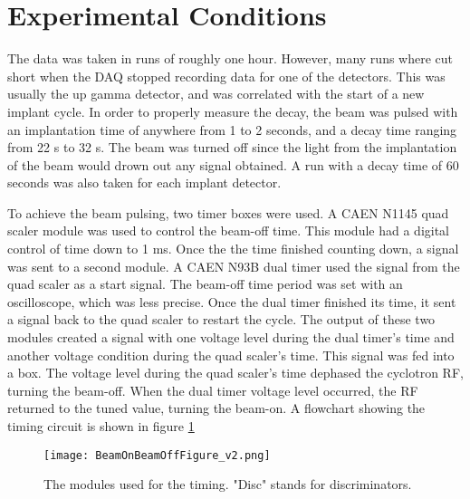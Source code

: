 \documentclass[../MaxHughesThesis.tex]{subfiles}
\begin{document}
\section{Experimental Conditions}
The data was taken in runs of roughly one hour. 
However, many runs where cut short when the DAQ stopped recording data for one of the detectors.
This was usually the up gamma detector, and was correlated with the start of a new implant cycle.
In order to properly measure the decay, the beam was pulsed with an implantation time of anywhere from 1 to 2 seconds, and a decay time ranging from 22 s to 32 s. 
The beam was turned off since the light from the implantation of the beam would drown out any signal obtained. 
A run with a decay time of 60 seconds was also taken for each implant detector. 

To achieve the beam pulsing, two timer boxes were used.
A CAEN N1145 quad scaler module was used to control the beam-off time.
This module had a digital control of time down to 1 ms.
Once the the time finished counting down, a signal was sent to a second module. 
A CAEN N93B dual timer used the signal from the quad scaler as a start signal.
The beam-off time period was set with an oscilloscope, which was less precise. 
Once the dual timer finished its time, it sent a signal back to the quad scaler to restart the cycle.
The output of these two modules created a signal with one voltage level during the dual timer's time and another voltage condition during the quad scaler's time.
This signal was fed into a box.
The voltage level during the quad scaler's time dephased the cyclotron RF, turning the beam-off.
When the dual timer voltage level occurred, the RF returned to the tuned value, turning the beam-on.  
A flowchart showing the timing circuit is shown in figure \ref{fig:TimingFig} 
\begin{figure}
	\centerline{\texttt{[image: BeamOnBeamOffFigure\_v2.png]}}
	\caption{The modules used for the timing.
		 "Disc" stands for discriminators.
		 }
	\label{fig:TimingFig}
\end{figure}
\end{document}
